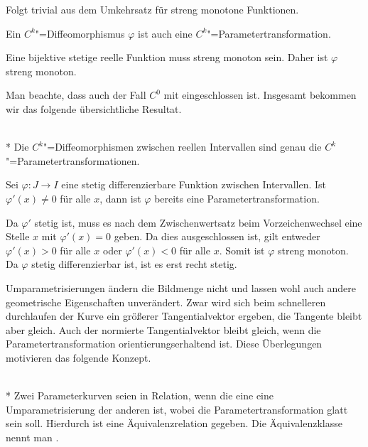 \noindent{}
Folgt trivial aus dem Umkehrsatz für streng monotone
Funktionen.\;\qedsymbol

\begin{corollary}
Ein $C^k$"=Diffeomorphismus $\varphi$ ist auch eine
$C^k$"=Parametertransformation.
\end{corollary}

\noindent{}
Eine bijektive stetige reelle Funktion muss streng monoton sein.
Daher ist $\varphi$ streng monoton.\;\qedsymbol

Man beachte, dass auch der Fall $C^0$ mit eingeschlossen ist.
Insgesamt bekommen wir das folgende übersichtliche Resultat.

\begin{corollary}\mbox{}\\*
Die $C^k$"=Diffeomorphismen zwischen reellen Intervallen sind
genau die $C^k$"=Parametertransformationen.
\end{corollary}

\begin{corollary}
Sei $\varphi\colon J\to I$ eine stetig differenzierbare
Funktion zwischen Intervallen. Ist $\varphi'(x)\ne 0$ für alle $x$,
dann ist $\varphi$ bereits eine Parametertransformation.
\end{corollary}

\noindent{}
Da $\varphi'$ stetig ist, muss es nach dem Zwischenwertsatz beim
Vorzeichenwechsel eine Stelle $x$ mit $\varphi'(x)=0$ geben. Da
dies ausgeschlossen ist, gilt entweder $\varphi'(x)>0$ für alle $x$
oder $\varphi'(x)<0$ für alle $x$. Somit ist $\varphi$ streng monoton.
Da $\varphi$ stetig differenzierbar ist, ist es erst recht
stetig.\;\qedsymbol

Umparametrisierungen ändern die Bildmenge nicht und lassen wohl auch
andere geometrische Eigenschaften unverändert. Zwar wird sich
beim schnelleren durchlaufen der Kurve ein größerer Tangentialvektor
ergeben, die Tangente bleibt aber gleich. Auch der normierte
Tangentialvektor bleibt gleich, wenn die Parametertransformation
orientierungserhaltend ist. Diese Überlegungen motivieren das folgende
Konzept.

\begin{definition}\mbox{}\\*
Zwei Parameterkurven seien in Relation, wenn die eine eine
Umparametrisierung der anderen ist, wobei die Parametertransformation
glatt sein soll. Hierdurch ist eine 
Äquivalenzrelation gegeben. Die Äquivalenzklasse nennt man
.
\end{definition}

